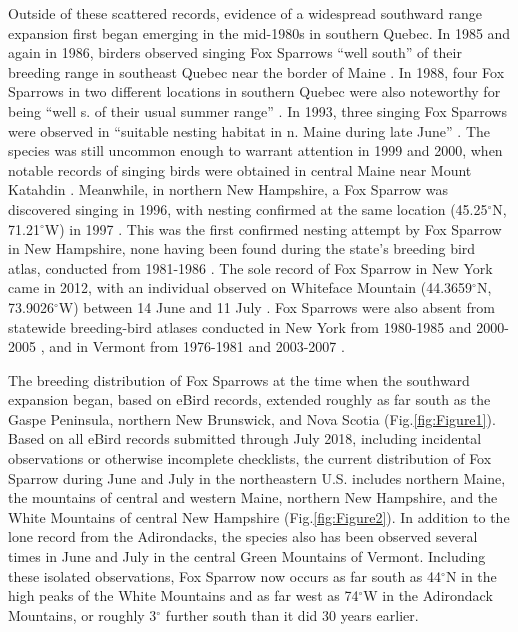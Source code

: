 \documentclass[fleqn,10pt,lineno]{wlpeerj} %
\begin{document}
Outside of these scattered records, evidence of a widespread southward range expansion first began emerging in the mid-1980s in southern Quebec. In 1985 and again in 1986, birders observed singing Fox Sparrows “well south” of their breeding range in southeast Quebec near the border of Maine \citep{Yank1986-pj,Yank1985-pj}. In 1988, four Fox Sparrows in two different locations in southern Quebec were also noteworthy for being “well s. of their usual summer range” \citep{Gosselin1988-vk}. In 1993, three singing Fox Sparrows were observed in “suitable nesting habitat in n. Maine during late June” \citep{Petersen1993-kb}. The species was still uncommon enough to warrant attention in 1999 and 2000, when notable records of singing birds were obtained in central Maine near Mount Katahdin \citep{Petersen1999-kb,Petersen2000-kb}. Meanwhile, in northern New Hampshire, a Fox Sparrow was discovered singing in 1996, with nesting confirmed at the same location (45.25$^{\circ}$N, 71.21$^{\circ}$W) in 1997 \citep{Keith2013-gt}. This was the first confirmed nesting attempt by Fox Sparrow in New Hampshire, none having been found during the state’s breeding bird atlas, conducted from 1981-1986 \citep{Foss1994-nl}. The sole record of Fox Sparrow in New York came in 2012, with an individual observed on Whiteface Mountain (44.3659$^{\circ}$N, 73.9026$^{\circ}$W) between 14 June and 11 July \citep{McCormack2012-ny}. Fox Sparrows were also absent from statewide breeding-bird atlases conducted in New York from 1980-1985 \citep{Andrle1988-jk} and 2000-2005 \citep{McGowan2008-em}, and in Vermont from 1976-1981 \citep{Laughlin1985-mn} and 2003-2007 \citep{Renfrew2013-kx}.

The breeding distribution of Fox Sparrows at the time when the southward expansion began, based on eBird records, extended roughly as far south as the Gaspe Peninsula, northern New Brunswick, and Nova Scotia (Fig.\ref{fig:Figure1}). Based on all eBird records submitted through July 2018, including incidental observations or otherwise incomplete checklists, the current distribution of Fox Sparrow during June and July in the northeastern U.S. includes northern Maine, the mountains of central and western Maine, northern New Hampshire, and the White Mountains of central New Hampshire (Fig.\ref{fig:Figure2}). In addition to the lone record from the Adirondacks, the species also has been observed several times in June and July in the central Green Mountains of Vermont. Including these isolated observations, Fox Sparrow now occurs as far south as 44$^{\circ}$N in the high peaks of the White Mountains and as far west as 74$^{\circ}$W in the Adirondack Mountains, or roughly 3$^{\circ}$ further south than it did 30 years earlier.
\end{document}
